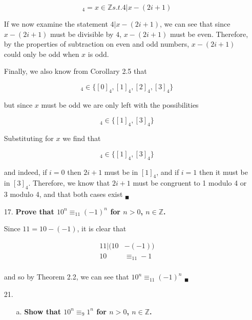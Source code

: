 \documentclass{article}
\begin{document}
\begin{enumerate}
				\begin{equation*}
					[2i + 1]_4 = {x \in \mathbb{Z} s.t. 4 | x - (2i + 1)}	
				\end{equation*}

			If we now examine the statement $4 | x - (2i + 1)$, we can see that since $x - (2i + 1)$
			must be divisible by $4$, $x - (2i + 1)$ must be even. Therefore, by the properties of 
			subtraction on even and odd numbers, $x - (2i + 1)$ could only be odd when $x$ is odd.

			Finally, we also know from Corollary 2.5 that 
			
				\begin{equation*}
					[x]_4 \in \lbrace [0]_4, [1]_4, [2]_4, [3]_4 \rbrace
				\end{equation*}

			but since $x$ must be odd we are only left with the possibilities
			
				\begin{equation*}
					[x]_4 \in \lbrace [1]_4, [3]_4 \rbrace
				\end{equation*}

			Substituting for $x$ we find that

				\begin{equation}
					[2i + 1]_4 \in \lbrace [1]_4, [3]_4 \rbrace
				\end{equation} 

			and indeed, if $i = 0$ then $2i + 1$ must be in $[1]_4$, and if $i = 1$ then it must be 
			in $[3]_4$. Therefore, we know that $2i + 1$ must be congruent to 1 modulo 4 or 3 modulo
			4, and that both cases exist $_{\blacksquare}$

		\item [17.]	\textbf{Prove that $10^n \equiv_{11} (-1)^n$ for $n > 0$, $n \in \mathbb{Z}$.}

			Since $11 = 10 - (-1)$, it is clear that 

				\begin{align*}
					11 | (10 & - (-1)) \\
					10 & \equiv_{11} -1 \\
				\end{align*}

			and so by Theorem 2.2, we can see that $10^n \equiv_{11} (-1)^n$ $_{\blacksquare}$

		\item [21.]	
			\begin{enumerate}
				\item [a.]	\textbf{Show that $10^n \equiv_9 1^n$ for $n > 0$, $n \in 
							\mathbb{Z}$.}


\end{enumerate}
\end{enumerate}
\end{document}
